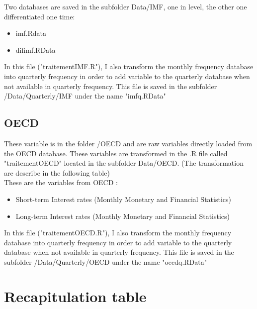 \documentclass[11pt,a4paper]{article}
\begin{document}
Two databases are saved in the subfolder Data/IMF, one in level, the other one differentiated one time: 

\begin{itemize}
\item imf.Rdata 
\item difimf.RData 
\end{itemize}

\vspace{0.5cm}

In this file ("traitementIMF.R"), I also transform the monthly frequency database into quarterly  frequency in order to add variable to the quarterly database when not available in quarterly frequency. This file is saved in the subfolder /Data/Quarterly/IMF under the name "imfq.RData" 






\subsection{OECD}

These variable is in the folder /OECD and are raw variables directly loaded from the OECD database.  These variables are transformed in the .R file called "traitementOECD" located in the subfolder Data/OECD. (The transformation are describe in the following table) \\


These are the variables from OECD :
\begin{itemize}
\item Short-term Interest rates (Monthly Monetary and Financial Statistics)
\item Long-term Interest rates (Monthly Monetary and Financial Statistics)
\end{itemize}

\vspace{0.5cm}

In this file ("traitementOECD.R"), I also transform the monthly frequency database into quarterly  frequency in order to add variable to the quarterly database when not available in quarterly frequency. This file is saved in the subfolder /Data/Quarterly/OECD under the name "oecdq.RData" 




\section{Recapitulation table}
\end{document}
